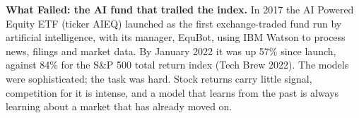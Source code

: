\begin{callout}
\textbf{What Failed: the AI fund that trailed the index.} In 2017 the AI Powered Equity ETF (ticker AIEQ) launched as the first exchange-traded fund run by artificial intelligence, with its manager, EquBot, using IBM Watson to process news, filings and market data. By January 2022 it was up 57\% since launch, against 84\% for the S\&P 500 total return index (Tech Brew 2022). The models were sophisticated; the task was hard. Stock returns carry little signal, competition for it is intense, and a model that learns from the past is always learning about a market that has already moved on.
\end{callout}

